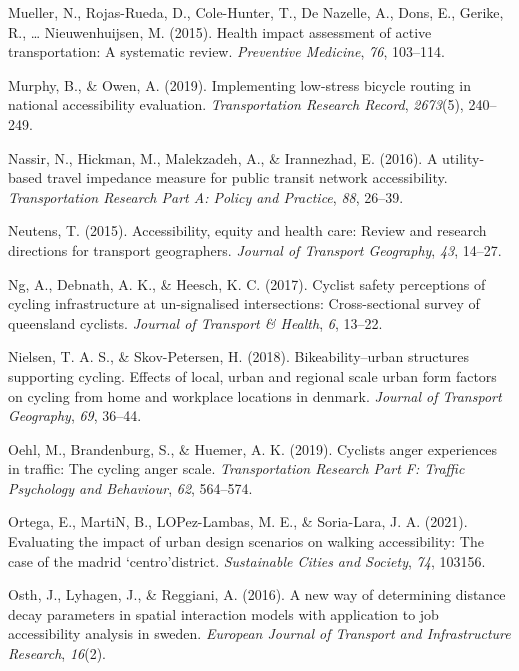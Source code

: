 \documentclass[
11pt, %
oneside, %
english, %
singlespacing, %
]{macthesis} %
\newlength{\cslhangindent}
\newenvironment{CSLReferences}[2] %
{\begin{list}{}{%
	\setlength{\itemindent}{0pt}
	\setlength{\leftmargin}{0pt}
	\setlength{\parsep}{0pt}
	\ifodd #1
	\setlength{\leftmargin}{\cslhangindent}
	\setlength{\itemindent}{-1\cslhangindent}
	\fi
	\setlength{\itemsep}{#2\baselineskip}}}
{\end{list}}
\begin{document}
\begin{CSLReferences}{1}{0}
Mueller, N., Rojas-Rueda, D., Cole-Hunter, T., De Nazelle, A., Dons, E., Gerike, R., \ldots{} Nieuwenhuijsen, M. (2015). Health impact assessment of active transportation: A systematic review. \emph{Preventive Medicine}, \emph{76}, 103--114.

Murphy, B., \& Owen, A. (2019). Implementing low-stress bicycle routing in national accessibility evaluation. \emph{Transportation Research Record}, \emph{2673}(5), 240--249.

Nassir, N., Hickman, M., Malekzadeh, A., \& Irannezhad, E. (2016). A utility-based travel impedance measure for public transit network accessibility. \emph{Transportation Research Part A: Policy and Practice}, \emph{88}, 26--39.

Neutens, T. (2015). Accessibility, equity and health care: Review and research directions for transport geographers. \emph{Journal of Transport Geography}, \emph{43}, 14--27.

Ng, A., Debnath, A. K., \& Heesch, K. C. (2017). Cyclist safety perceptions of cycling infrastructure at un-signalised intersections: Cross-sectional survey of queensland cyclists. \emph{Journal of Transport \& Health}, \emph{6}, 13--22.

Nielsen, T. A. S., \& Skov-Petersen, H. (2018). Bikeability--urban structures supporting cycling. Effects of local, urban and regional scale urban form factors on cycling from home and workplace locations in denmark. \emph{Journal of Transport Geography}, \emph{69}, 36--44.

Oehl, M., Brandenburg, S., \& Huemer, A. K. (2019). Cyclists anger experiences in traffic: The cycling anger scale. \emph{Transportation Research Part F: Traffic Psychology and Behaviour}, \emph{62}, 564--574.

Ortega, E., MartiN, B., LOPez-Lambas, M. E., \& Soria-Lara, J. A. (2021). Evaluating the impact of urban design scenarios on walking accessibility: The case of the madrid `centro'district. \emph{Sustainable Cities and Society}, \emph{74}, 103156.

Osth, J., Lyhagen, J., \& Reggiani, A. (2016). A new way of determining distance decay parameters in spatial interaction models with application to job accessibility analysis in sweden. \emph{European Journal of Transport and Infrastructure Research}, \emph{16}(2).


\end{CSLReferences}
\end{document}
